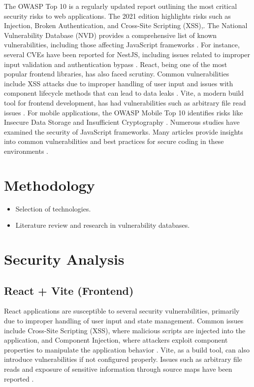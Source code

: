 \documentclass[conference]{IEEEtran}
\begin{document}
The OWASP Top 10 is a regularly updated report outlining the most critical security risks to web applications. 
The 2021 edition highlights risks such as Injection, Broken Authentication, and Cross-Site Scripting (XSS),\cite{owasp2021}. 
The National Vulnerability Database (NVD) provides a comprehensive list of known vulnerabilities, including those affecting JavaScript frameworks \cite{nvd}. For instance, several CVEs have been reported for NestJS, including issues related to improper input validation and authentication bypass \cite{cveNest}. React, being one of the most popular frontend libraries, has also faced scrutiny. Common vulnerabilities include XSS attacks due to improper handling of user input and issues with component lifecycle methods that can lead to data leaks \cite{reactSecurity, reactFlaw}. Vite, a modern build tool for frontend development, has had vulnerabilities such as arbitrary file read issues \cite{viteFlaw}.
For mobile applications, the OWASP Mobile Top 10 identifies risks like Insecure Data Storage and Insufficient Cryptography \cite{owaspMobile}. Numerous studies have examined the security of JavaScript frameworks. Many articles provide insights into common vulnerabilities and best practices for secure coding in these environments \cite{reactNativeSec}.

\section{Methodology}
\begin{itemize}
    \item Selection of technologies.
    \item Literature review and research in vulnerability databases.
\end{itemize}

\section{Security Analysis}
\subsection{React + Vite (Frontend)}
React applications are susceptible to several security vulnerabilities, primarily due to improper handling of user input and state management. Common issues include Cross-Site Scripting (XSS), where malicious scripts are injected into the application, and Component Injection, where attackers exploit component properties to manipulate the application behavior \cite{reactSecurity, reactFlaw}. Vite, as a build tool, can also introduce vulnerabilities if not configured properly. Issues such as arbitrary file reads and exposure of sensitive information through source maps have been reported \cite{viteFlaw}.
\end{document}
